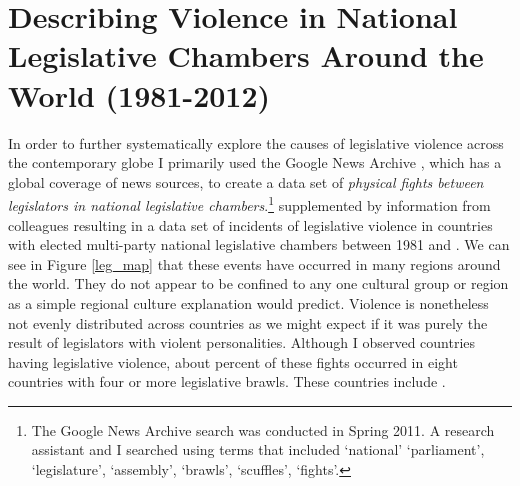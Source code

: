 \documentclass[a4paper]{article}\usepackage[]{graphicx}\usepackage[]{color}
\begin{document}
\section{Describing Violence in National Legislative Chambers Around the World (1981-2012)}

In order to further systematically explore the causes of legislative violence across the contemporary globe I primarily used the Google News Archive \citep{GoogleNews2011}, which has a global coverage of news sources,  to create a data set of {\emph{physical fights between legislators in national legislative chambers}}.\footnote{The Google News Archive search was conducted in Spring 2011. A research assistant and I searched using terms that included `national' `parliament', `legislature', `assembly', `brawls', `scuffles', `fights'. }  supplemented by information from colleagues resulting in a data set of  incidents of legislative violence in  countries with elected multi-party national legislative chambers between 1981 and . We can see in Figure \ref{leg_map} that these events have occurred in many regions around the world. They do not appear to be confined to any one cultural group or region as a simple regional culture explanation would predict. Violence is nonetheless not evenly distributed across countries as we might expect if it was purely the result of legislators with violent personalities. Although I observed  countries having legislative violence, about  percent of these fights occurred in eight countries with four or more legislative brawls. These countries include\add{:} .
\end{document}
